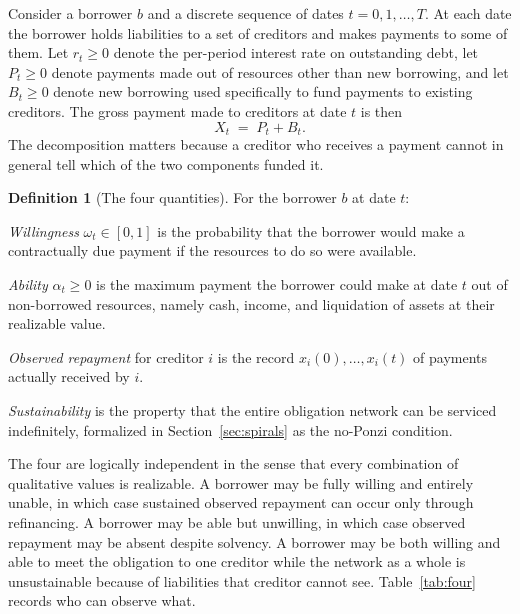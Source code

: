 \documentclass[11pt]{article}
\theoremstyle{definition}
\newtheorem{definition}[theorem]{Definition}
\theoremstyle{remark}
\begin{document}
Consider a borrower $b$ and a discrete sequence of dates $t=0,1,\ldots,T$. At each date the borrower holds liabilities to a set of creditors and makes payments to some of them. Let $r_t\ge 0$ denote the per-period interest rate on outstanding debt, let $P_t\ge 0$ denote payments made out of resources other than new borrowing, and let $B_t\ge 0$ denote new borrowing used specifically to fund payments to existing creditors. The gross payment made to creditors at date $t$ is then
\[
X_t \;=\; P_t + B_t .
\]
The decomposition matters because a creditor who receives a payment cannot in general tell which of the two components funded it.

\begin{definition}[The four quantities]\label{def:four}
For the borrower $b$ at date $t$:
\par\smallskip\noindent \emph{Willingness} $\omega_t\in[0,1]$ is the probability that the borrower would make a contractually due payment if the resources to do so were available.
\par\smallskip\noindent \emph{Ability} $\alpha_t\ge 0$ is the maximum payment the borrower could make at date $t$ out of non-borrowed resources, namely cash, income, and liquidation of assets at their realizable value.
\par\smallskip\noindent \emph{Observed repayment} for creditor $i$ is the record $x_i(0),\ldots,x_i(t)$ of payments actually received by $i$.
\par\smallskip\noindent \emph{Sustainability} is the property that the entire obligation network can be serviced indefinitely, formalized in Section~\ref{sec:spirals} as the no-Ponzi condition.
\end{definition}

The four are logically independent in the sense that every combination of qualitative values is realizable. A borrower may be fully willing and entirely unable, in which case sustained observed repayment can occur only through refinancing. A borrower may be able but unwilling, in which case observed repayment may be absent despite solvency. A borrower may be both willing and able to meet the obligation to one creditor while the network as a whole is unsustainable because of liabilities that creditor cannot see. Table~\ref{tab:four} records who can observe what.
\end{document}
